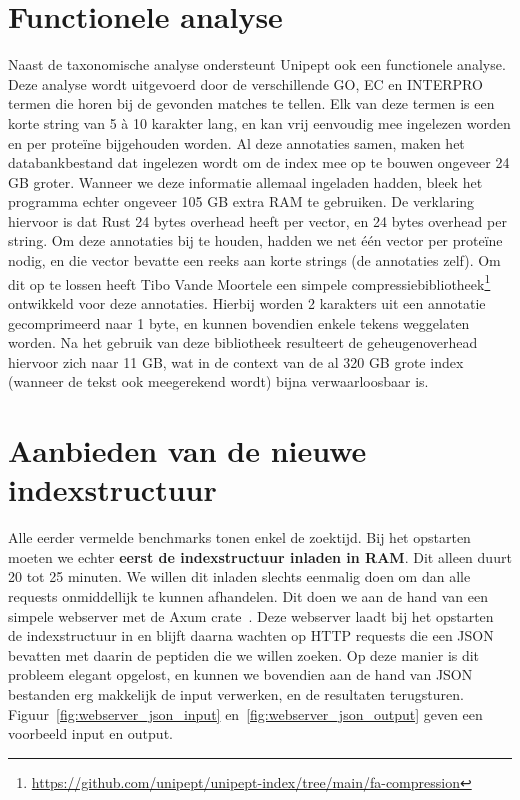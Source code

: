 \section{Functionele analyse}\label{sec:functionele-analyse}
Naast de taxonomische analyse ondersteunt Unipept ook een functionele analyse.
Deze analyse wordt uitgevoerd door de verschillende GO, EC en INTERPRO termen die horen bij de gevonden matches te tellen.
Elk van deze termen is een korte string van 5 à 10 karakter lang, en kan vrij eenvoudig mee ingelezen worden en per proteïne bijgehouden worden.
Al deze annotaties samen, maken het databankbestand dat ingelezen wordt om de index mee op te bouwen ongeveer 24 GB groter.
Wanneer we deze informatie allemaal ingeladen hadden, bleek het programma echter ongeveer 105 GB extra RAM te gebruiken.
De verklaring hiervoor is dat Rust 24 bytes overhead heeft per vector, en 24 bytes overhead per string.
Om deze annotaties bij te houden, hadden we net één vector per proteïne nodig, en die vector bevatte een reeks aan korte strings (de annotaties zelf).
Om dit op te lossen heeft Tibo Vande Moortele een simpele compressiebibliotheek\footnote{\url{https://github.com/unipept/unipept-index/tree/main/fa-compression}} ontwikkeld voor deze annotaties.
Hierbij worden 2 karakters uit een annotatie gecomprimeerd naar 1 byte, en kunnen bovendien enkele tekens weggelaten worden.
Na het gebruik van deze bibliotheek resulteert de geheugenoverhead hiervoor zich naar 11 GB, wat in de context van de al 320 GB grote index (wanneer de tekst ook meegerekend wordt) bijna verwaarloosbaar is.

\section{Aanbieden van de nieuwe indexstructuur}\label{sec:aanbieden-van-de-nieuwe-indexstructuur}
Alle eerder vermelde benchmarks tonen enkel de zoektijd.
Bij het opstarten moeten we echter \textbf{eerst de indexstructuur inladen in RAM}.
Dit alleen duurt 20 tot 25 minuten.
We willen dit inladen slechts eenmalig doen om dan alle requests onmiddellijk te kunnen afhandelen.
Dit doen we aan de hand van een simpele webserver met de Axum crate~\cite{axum}.
Deze webserver laadt bij het opstarten de indexstructuur in en blijft daarna wachten op HTTP requests die een JSON bevatten met daarin de peptiden die we willen zoeken.
Op deze manier is dit probleem elegant opgelost, en kunnen we bovendien aan de hand van JSON bestanden erg makkelijk de input verwerken, en de resultaten terugsturen.
Figuur~\ref{fig:webserver_json_input} en~\ref{fig:webserver_json_output} geven een voorbeeld input en output.

